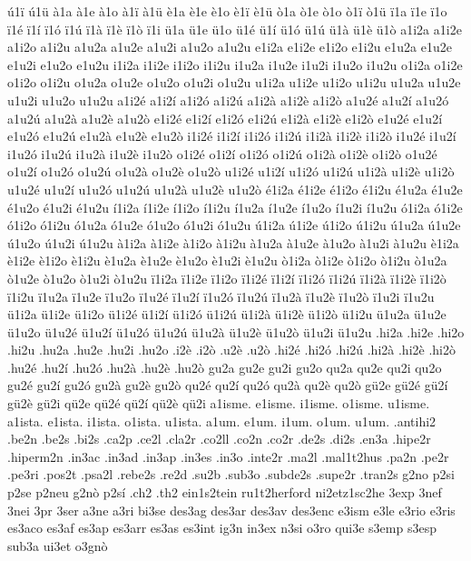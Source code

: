 {ú1ï ú1ü
à1a à1e à1o
à1ï à1ü
è1a è1e è1o
è1ï è1ü
ò1a ò1e ò1o
ò1ï ò1ü
ï1a ï1e ï1o ï1é ï1í
ï1ó ï1ú ï1à
ï1è ï1ò ï1i
ü1a ü1e ü1o ü1é ü1í
ü1ó ü1ú ü1à
ü1è ü1ò
%
a1i2a a1i2e a1i2o a1i2u
a1u2a a1u2e a1u2i a1u2o a1u2u
e1i2a e1i2e e1i2o e1i2u
e1u2a e1u2e e1u2i e1u2o e1u2u
i1i2a i1i2e i1i2o i1i2u
i1u2a i1u2e i1u2i i1u2o i1u2u
o1i2a o1i2e o1i2o o1i2u
o1u2a o1u2e o1u2o o1u2i o1u2u
u1i2a u1i2e u1i2o u1i2u
u1u2a u1u2e u1u2i u1u2o u1u2u
a1i2é a1i2í a1i2ó a1i2ú a1i2à
a1i2è a1i2ò
a1u2é a1u2í a1u2ó a1u2ú a1u2à
a1u2è a1u2ò
e1i2é e1i2í e1i2ó e1i2ú e1i2à
e1i2è e1i2ò
e1u2é e1u2í e1u2ó e1u2ú e1u2à
e1u2è e1u2ò
i1i2é i1i2í i1i2ó i1i2ú i1i2à
i1i2è i1i2ò
i1u2é i1u2í i1u2ó i1u2ú i1u2à
i1u2è i1u2ò
o1i2é o1i2í o1i2ó o1i2ú o1i2à
o1i2è o1i2ò
o1u2é o1u2í o1u2ó o1u2ú o1u2à
o1u2è o1u2ò
u1i2é u1i2í u1i2ó u1i2ú u1i2à
u1i2è u1i2ò
u1u2é u1u2í u1u2ó u1u2ú u1u2à
u1u2è u1u2ò
é1i2a é1i2e é1i2o é1i2u
é1u2a é1u2e é1u2o é1u2i é1u2u
í1i2a í1i2e í1i2o í1i2u
í1u2a í1u2e í1u2o í1u2i í1u2u
ó1i2a ó1i2e ó1i2o ó1i2u
ó1u2a ó1u2e ó1u2o ó1u2i ó1u2u
ú1i2a ú1i2e ú1i2o ú1i2u
ú1u2a ú1u2e ú1u2o ú1u2i ú1u2u
à1i2a à1i2e à1i2o à1i2u
à1u2a à1u2e à1u2o à1u2i à1u2u
è1i2a è1i2e è1i2o è1i2u
è1u2a è1u2e è1u2o è1u2i è1u2u
ò1i2a ò1i2e ò1i2o ò1i2u
ò1u2a ò1u2e ò1u2o ò1u2i ò1u2u
ï1i2a ï1i2e ï1i2o ï1i2é ï1i2í
ï1i2ó
ï1i2ú ï1i2à
ï1i2è ï1i2ò ï1i2u
ï1u2a ï1u2e ï1u2o ï1u2é ï1u2í
ï1u2ó
ï1u2ú ï1u2à
ï1u2è ï1u2ò ï1u2i ï1u2u
ü1i2a ü1i2e ü1i2o ü1i2é ü1i2í
ü1i2ó
ü1i2ú ü1i2à
ü1i2è ü1i2ò ü1i2u
ü1u2a ü1u2e ü1u2o ü1u2é ü1u2í
ü1u2ó
ü1u2ú ü1u2à
ü1u2è ü1u2ò ü1u2i ü1u2u
%
.hi2a .hi2e .hi2o .hi2u .hu2a .hu2e .hu2i .hu2o
.i2è .i2ò
.u2è .u2ò
.hi2é .hi2ó .hi2ú .hi2à .hi2è
.hi2ò
.hu2é .hu2í .hu2ó .hu2à .hu2è
.hu2ò
%
gu2a gu2e gu2i gu2o qu2a qu2e qu2i qu2o
gu2é gu2í gu2ó gu2à gu2è
gu2ò
qu2é qu2í qu2ó qu2à qu2è
qu2ò
gü2e gü2é gü2í gü2è gü2i
qü2e qü2é qü2í qü2è qü2i
%
a1isme. e1isme. i1isme. o1isme. u1isme.
a1ista. e1ista. i1ista. o1ista. u1ista.
a1um. e1um. i1um. o1um. u1um.
%
.antihi2 .be2n .be2s .bi2s .ca2p .ce2l .cla2r .co2ll .co2n .co2r .de2s
.di2s .en3a .hipe2r .hiperm2n .in3ac .in3ad .in3ap .in3es .in3o
.inte2r .ma2l .mal1t2hus .pa2n .pe2r .pe3ri .pos2t .psa2l .rebe2s
.re2d .su2b .sub3o .subde2s .supe2r .tran2s
%
g2no p2si p2se p2neu
g2nò p2sí
%
.ch2 .th2
ein1s2tein ru1t2herford ni2etz1sc2he
%
3exp 3nef 3nei 3pr 3ser a3ne a3ri bi3se des3ag des3ar des3av des3enc
e3ism e3le e3rio e3ris es3aco es3af es3ap es3arr es3as es3int
ig3n in3ex n3si o3ro qui3e s3emp s3esp sub3a ui3et
o3gnò
}

